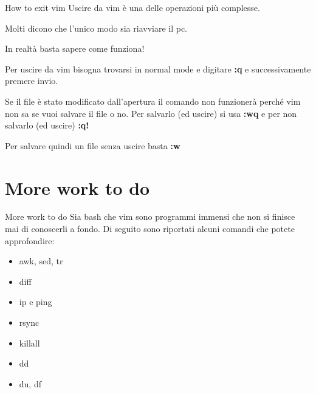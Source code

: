 \documentclass{beamer}
\begin{document}
\begin{frame}{How to exit vim}
  Uscire da vim è una delle operazioni più complesse. \medskip \pause

  Molti dicono che l'unico modo sia riavviare il pc. \medskip \pause

  In realtà basta sapere come funziona! \medskip

  Per uscire da vim bisogna trovarsi in normal mode e digitare \textbf{:q} e 
  successivamente premere invio.\medskip

  Se il file è stato modificato dall'apertura il comando non funzionerà perché
  vim non sa se vuoi salvare il file o no. Per salvarlo (ed uscire) si usa 
  \textbf{:wq} e per non salvarlo (ed uscire) \textbf{:q!} \medskip

  Per salvare quindi un file senza uscire basta \textbf{:w}
\end{frame}

\section{More work to do}
\begin{frame}{More work to do}
  Sia bash che vim sono programmi immensi che non si finisce mai di conoscerli a
  fondo. Di seguito sono riportati alcuni comandi che potete approfondire: 
  \medskip
  \begin{itemize}
    \item awk, sed, tr
    \item diff
    \item ip e ping
    \item rsync
    \item killall
    \item dd
    \item du, df
  \end{itemize}
\end{frame}
\end{document}
